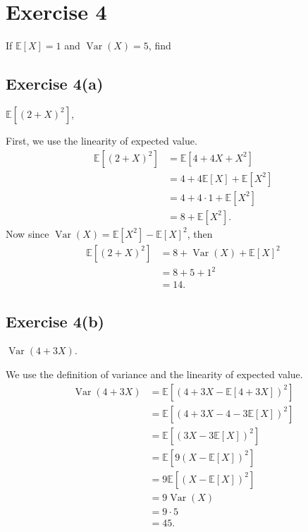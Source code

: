 \documentclass[12pt]{article}
\newenvironment{problem}
    {\begin{lrbox}{\mybox}\begin{minipage}{0.98\textwidth}}
    {\end{minipage}\end{lrbox}\framebox[\textwidth]{\usebox{\mybox}}}
\newcommand{\E}{\mathbb{E}} %
\newcommand{\<}{\left\langle} %
\renewcommand{\>}{\right\rangle} %
\begin{document}
\newpage
\section*{Exercise 4}
\begin{problem}
    If $\E[X] = 1$ and $\operatorname{Var}(X) = 5$, find
\end{problem}

\subsection*{Exercise 4(a)}
\begin{problem}
    $\E[(2 + X)^2]$,
\end{problem}
\medskip

First, we use the linearity of expected value.
\begin{align*}
    \E[(2 + X)^2]
        &= \E[4 + 4X + X^2] \\
        &= 4 + 4\E[X] + \E[X^2] \\
        &= 4 + 4\cdot 1 + \E[X^2] \\
        &= 8 + \E[X^2].
\end{align*}
Now since $\operatorname{Var}(X) = \E[X^2] - \E[X]^2$, then
\begin{align*}
    \E[(2 + X)^2]
        &= 8 + \operatorname{Var}(X) + \E[X]^2 \\
        &= 8 + 5 + 1^2 \\
        &= 14.
\end{align*}


\subsection*{Exercise 4(b)}
\begin{problem}
    $\operatorname{Var}(4 + 3X)$.
\end{problem}
\medskip

We use the definition of variance and the linearity of expected value.
\begin{align*}
    \operatorname{Var}(4 + 3X)
        &= \E[(4 + 3X - \E[4 + 3X])^2] \\
        &= \E[(4 + 3X - 4 - 3\E[X])^2] \\
        &= \E[(3X - 3\E[X])^2] \\
        &= \E[9(X - \E[X])^2] \\
        &= 9\E[(X - \E[X])^2] \\
        &= 9\operatorname{Var}(X) \\
        &= 9 \cdot 5 \\
        &= 45.
\end{align*}
\end{document}
